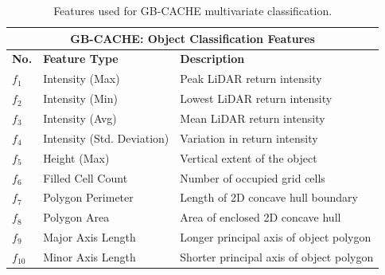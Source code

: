 \documentclass{erauthesis}
\begin{document}
\begin{table}[htbp]
\centering
\begin{tabular}{lll}
\hline
\multicolumn{3}{c}{GB-CACHE: Object Classification Features}\\
\hline
\hline
\textbf{No.} & \textbf{Feature Type} & \textbf{Description} \\ 
\hline
$f_1$ & Intensity (Max) & Peak LiDAR return intensity \\
$f_2$ & Intensity (Min) & Lowest LiDAR return intensity \\
$f_3$ & Intensity (Avg) & Mean LiDAR return intensity \\
$f_4$ & Intensity (Std. Deviation) & Variation in return intensity \\
$f_5$ & Height (Max) & Vertical extent of the object \\
$f_6$ & Filled Cell Count & Number of occupied grid cells \\
$f_7$ & Polygon Perimeter & Length of 2D concave hull boundary \\
$f_8$ & Polygon Area & Area of enclosed 2D concave hull \\
$f_9$ & Major Axis Length & Longer principal axis of object polygon \\
$f_{10}$ & Minor Axis Length & Shorter principal axis of object polygon \\
\hline
\end{tabular}
\caption{Features used for GB-CACHE multivariate classification.}
\label{tab:gbcache_features}
\end{table}



\end{document}
